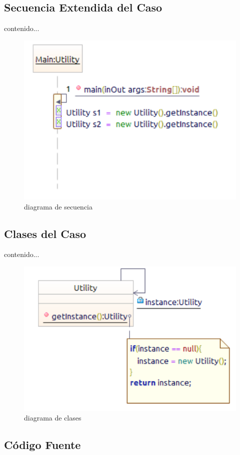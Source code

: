\subsection{Secuencia Extendida del Caso}
contenido...
\begin{figure}[th!]
	\centering
	\includegraphics[width=0.7\linewidth]{arquitectura_diseno/imgs/CSE_Singleton}
	\caption{diagrama de secuencia}
\end{figure}
\newpage
\subsection{Clases  del Caso}
contenido...
\begin{figure}[th!]
	\centering
	\includegraphics[width=0.7\linewidth]{arquitectura_diseno/imgs/CCL_Singleton}
	\caption{diagrama de clases}
\end{figure}
\newpage
\subsection{Código Fuente}
%